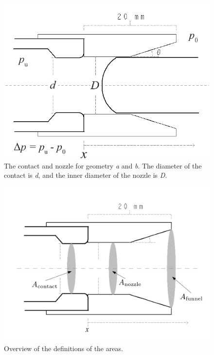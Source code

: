 \documentclass[10pt,b5paper,twoside]{article}
\begin{document}
\begin{figure} [h]
\centering
\includegraphics[scale=0.45]{Bilder/Method/ContactAndNozzleFunnelShape5.png}
\caption{The contact and nozzle for geometry \textit{a} and \textit{b}. The diameter of the contact is \textit{d}, and the inner diameter of the nozzle is \textit{D}.} \label{fig:contactAndNozzle}
\end{figure}

\begin{figure} [H] %
\centering
\includegraphics[scale=0.35]{Bilder/Method/AreaDef.png}
\caption{Overview of the definitions of the areas.} \label{fig:AreacontactAndNozzle}
\end{figure}
\end{document}
